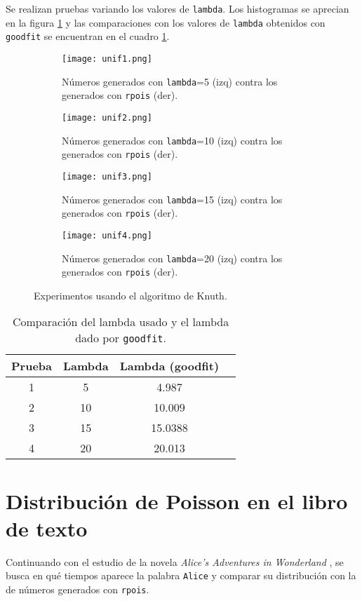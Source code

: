 \documentclass[12pt,letterpaper]{article}
\begin{document}
Se realizan pruebas variando los valores de \texttt{lambda}. Los histogramas se aprecian en la figura \ref{datosunif} y las comparaciones con los valores de \texttt{lambda} obtenidos con \texttt{goodfit} se encuentran en el cuadro \ref{datosunif}.
\begin{figure}
 	\centering 
 	\begin{subfigure}[b]{0.45\linewidth}
 		\texttt{[image: unif1.png]} 		
 		\caption{Números generados con \texttt{lambda}=5 (izq) contra los generados con \texttt{rpois} (der).}
 		 		\label{pr1unif}
 	\end{subfigure}
 	 	\hfill
 	\begin{subfigure}[b]{0.45\linewidth}
 		\texttt{[image: unif2.png]} 		
 		\caption{Números generados con \texttt{lambda}=10 (izq) contra los generados con \texttt{rpois} (der).}
 		\label{pr2unif}
 	\end{subfigure}
 	 	\begin{subfigure}[b]{0.45\linewidth}
 		\texttt{[image: unif3.png]} 		
 		\caption{Números generados con \texttt{lambda}=15 (izq) contra los generados con \texttt{rpois} (der).}
 		\label{pr3unif}
 	\end{subfigure}
 	 	\hfill
 	 	\begin{subfigure}[b]{0.45\linewidth}
 		\texttt{[image: unif4.png]} 		
 		\caption{Números generados con \texttt{lambda}=20 (izq) contra los generados con \texttt{rpois} (der).}
 		\label{pr4unif}
 	\end{subfigure}
 	 	\caption{Experimentos usando el algoritmo de Knuth.} 
 	 		\label{prsunif}
\end{figure}

\begin{table}
\centering
\caption{Comparación del lambda usado y el lambda dado por \texttt{goodfit}.}
\begin{tabular}{cccr}
\hline 
Prueba & Lambda & Lambda (goodfit) \\ 
\hline 
1 & 5 & 4.987 \\ 
2 & 10 & 10.009 \\ 
3 & 15 & 15.0388 \\ 
4 & 20 & 20.013 \\ 
\hline 
\end{tabular} 
\label{datosunif}
\end{table}

\section{Distribución de Poisson en el libro de texto}
Continuando con el estudio de la novela \textit{Alice's Adventures in Wonderland} \cite{alice}, se busca en qué tiempos aparece la palabra \texttt{Alice} y comparar su distribución con la de números generados con \texttt{rpois}.
\end{document}
